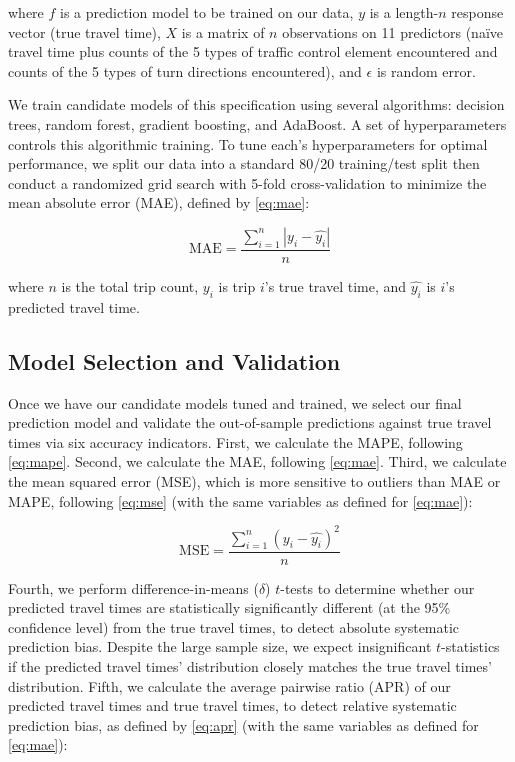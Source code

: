 \documentclass[12pt,letterpaper]{article} %
\begin{document}
where $f$ is a prediction model to be trained on our data, $y$ is a length-$n$ response vector (true travel time), $X$ is a matrix of $n$ observations on 11 predictors (naïve travel time plus counts of the 5 types of traffic control element encountered and counts of the 5 types of turn directions encountered), and $\epsilon$ is random error.

We train candidate models of this specification using several algorithms: decision trees, random forest, gradient boosting, and AdaBoost. A set of hyperparameters controls this algorithmic training. To tune each's hyperparameters for optimal performance, we split our data into a standard 80/20 training/test split then conduct a randomized grid search with 5-fold cross-validation to minimize the mean absolute error (MAE), defined by \autoref{eq:mae}:

\begin{equation}
\label{eq:mae}
\text{MAE} = \frac{\sum^{n}_{i=1} \left|{y_i - \hat{y_i}}\right|}{n}
\end{equation}

where $n$ is the total trip count, $y_i$ is trip $i$'s true travel time, and $\hat{y_i}$ is $i$'s predicted travel time.

\subsection{Model Selection and Validation}

Once we have our candidate models tuned and trained, we select our final prediction model and validate the out-of-sample predictions against true travel times via six accuracy indicators. First, we calculate the MAPE, following \autoref{eq:mape}. Second, we calculate the MAE, following \autoref{eq:mae}. Third, we calculate the mean squared error (MSE), which is more sensitive to outliers than MAE or MAPE, following \autoref{eq:mse} (with the same variables as defined for \autoref{eq:mae}):

\begin{equation}
\label{eq:mse}
\text{MSE} = \frac{\sum^{n}_{i=1} (y_i - \hat{y_i})^2}{n}
\end{equation}

Fourth, we perform difference-in-means ($\delta$) $t$-tests to determine whether our predicted travel times are statistically significantly different (at the 95\% confidence level) from the true travel times, to detect absolute systematic prediction bias. Despite the large sample size, we expect insignificant $t$-statistics if the predicted travel times' distribution closely matches the true travel times' distribution. Fifth, we calculate the average pairwise ratio (APR) of our predicted travel times and true travel times, to detect relative systematic prediction bias, as defined by \autoref{eq:apr} (with the same variables as defined for \autoref{eq:mae}):
\end{document}
